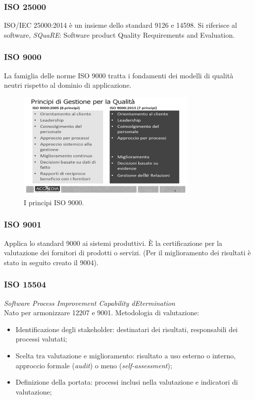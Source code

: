 			\subsubsection{ISO 25000}	\label{2500}
			ISO/IEC 25000:2014 è un insieme dello standard 9126 e 14598.
			Si riferisce al software, \textit{SQuaRE}: Software product Quality Requirements and Evaluation.
			
			\subsubsection{ISO 9000}	\label{9000}
			La famiglia delle norme ISO 9000 tratta i fondamenti dei modelli di qualità neutri rispetto al dominio di applicazione.
			
			\begin{figure}[H]
				\centering
				\includegraphics[width=0.78\textwidth]{img/9000}		
				\caption{I principi ISO 9000.}
			\end{figure} 
			
			\subsubsection{ISO 9001}	\label{9001}
			Applica lo standard 9000 ai sistemi produttivi. È la certificazione per la valutazione dei fornitori di prodotti o servizi. (Per il miglioramento dei risultati è stato in seguito creato il 9004).
			
			\subsubsection{ISO 15504}	\label{15504}
			\textit{Software Process Improvement Capability dEtermination} \\
			Nato per armonizzare 12207 e 9001. Metodologia di valutazione:
			\begin{itemize}
				\item Identificazione degli stakeholder: destinatari dei risultati, responsabili dei processi valutati;
				\item Scelta tra valutazione e miglioramento: risultato a uso esterno o interno, approccio formale (\textit{audit}) o meno (\textit{self-assessment}); 
				\item Definizione della portata: processi inclusi nella valutazione e indicatori di valutazione;
			\end{itemize}
		
